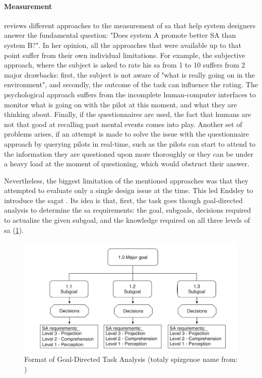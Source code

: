 \paragraph{Measurement}
\cite[p.~791-792]{endsley_situation_1988} reviews different approaches to the measurement of \gls{sa} that help system designers answer the fundamental question: "Does system A promote better SA than system B?". In her opinion, all the approaches that were available up to that point suffer from their own individual limitations. For example, the subjective approach, where the subject is asked to rate his \gls{sa} from 1 to 10 suffers from 2 major drawbacks: first, the subject is not aware of "what is really going on in the environment", and secondly, the outcome of the task can influence the rating. The psychological approach suffers from the incomplete human-computer interfaces to monitor what is going on with the pilot at this moment, and what they are thinking about. Finally, if the questionnaires are used, the fact that humans are not that good at recalling past mental events comes into play. Another set of problems arises, if an attempt is made to solve the issue with the questionnaire approach by querying pilots in real-time, such as the pilots can start to attend to the information they are questioned upon more thoroughly or they can be under a heavy load at the moment of questioning, which would obstruct their answer.

Nevertheless, the biggest limitation of the mentioned approaches was that they attempted to evaluate only a single design issue at the time. This led Endsley to introduce the \gls{sagat} \cite{endsley_situation_1988}. Its idea is that, first, the task goes though goal-directed analysis to determine the \gls{sa} requirements: the goal, subgoals, decisions required to actualize the given subgoal, and the knowledge required on all three levels of \gls{sa} (\ref{fig:sagoalorientedtaskanalysis}). 

\begin{figure}
	\centering
	\includegraphics[width=0.7\linewidth]{figures/placeholders/SA_goal_oriented_task_analysis}
	\caption{Format of Goal-Directed Task Analysis (totaly spizgenoe name from: \cite{endsley_direct_nodate})}
	\label{fig:sagoalorientedtaskanalysis}
\end{figure}

